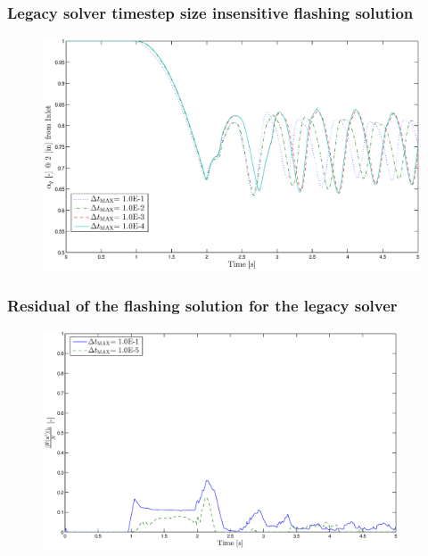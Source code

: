 \documentclass[compress,xcolor=table]{beamer}
\begin{document}
\begin{frame}
\frametitle{Legacy solver timestep size insensitive flashing solution}

\begin{figure}[h!t]
\centering
\includegraphics[width=.94\textwidth]{images/cobra_flashing_1em1_1em4.eps}
\end{figure}

\end{frame}
\begin{frame}
\frametitle{Residual of the flashing solution for the legacy solver}

\begin{figure}[h!t]
\centering
\includegraphics[width=0.94\textwidth]{images/cobra_flashing_res_compare.eps}
\end{figure}

\end{frame}
\end{document}
